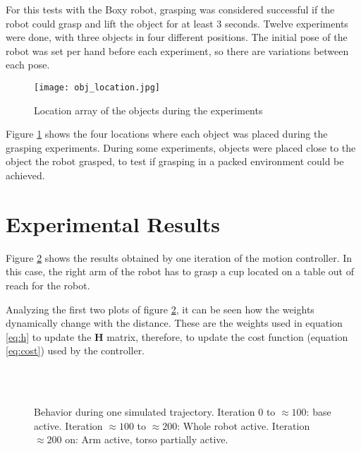 For this tests with the Boxy robot, grasping was considered successful if the robot could grasp and lift the object for at least 3 seconds. Twelve experiments were done, with three objects in four different positions. The initial pose of the robot was set per hand before each experiment, so there are variations between each pose.

 \begin{figure}[H]
 	\centering
 	{\texttt{[image: obj\_location.jpg]}}
 	\vspace{-12pt}
 	\caption[Objects location]{Location array of the objects during the experiments}
 	\vspace{-15pt}
 	\label{fig:loc}
 \end{figure}

Figure \ref{fig:loc} shows the four locations where each object was placed during the grasping experiments.  During some experiments, objects were placed close to the object the robot grasped, to test if grasping in a packed environment could be achieved.

\section{Experimental Results}

Figure \ref{fig:exp} shows the results obtained by one iteration of the motion controller. In this case, the right arm of the robot has to grasp a cup located on a table out of reach for the robot.

Analyzing  the first two plots of figure \ref{fig:exp}, it can be seen how the weights dynamically change with the distance. These are the weights used in equation \ref{eq:h} to update the $\textbf{H}$ matrix, therefore, to update the cost function (equation \ref{eq:cost}) used by the controller. 

\begin{figure}[H]
	\centering
	 \\ \vspace{-10pt}
	 \\ \vspace{-5pt}
	 \vspace{-8pt}
	 \vspace{-5pt}
	 \vspace{-20pt}
	\caption[Trajectory Result]{Behavior during one simulated trajectory. Iteration $0$ to $\approx100$: base active. Iteration $\approx100$ to $\approx200$: Whole robot active. Iteration $\approx200$ on: Arm active, torso partially active.} \vspace{-15pt} \label{fig:exp}
\end{figure}

